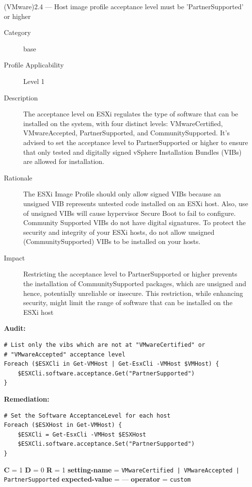 \documentclass[a4paper,11pt]{report}
\begin{document}
\begin{datasetrow}{(VMware)2.4 --- Host image profile acceptance level must be 'PartnerSupported' or higher}

\begin{description}
    \item[Category] base
    \item[Profile Applicability] Level 1
    \item[Description] The acceptance level on ESXi regulates the type of software that can be installed on the system, with four distinct levels: VMwareCertified, VMwareAccepted, PartnerSupported, and CommunitySupported. It's advised to set the acceptance level to PartnerSupported or higher to ensure that only tested and digitally signed vSphere Installation Bundles (VIBs) are allowed for installation.
    \item[Rationale] The ESXi Image Profile should only allow signed VIBs because an unsigned VIB represents untested code installed on an ESXi host. Also, use of unsigned VIBs will cause hypervisor Secure Boot to fail to configure. Community Supported VIBs do not have digital signatures. To protect the security and integrity of your ESXi hosts, do not allow unsigned (CommunitySupported) VIBs to be installed on your hosts.
    \item[Impact] Restricting the acceptance level to PartnerSupported or higher prevents the installation of CommunitySupported packages, which are unsigned and hence, potentially unreliable or insecure. This restriction, while enhancing security, might limit the range of software that can be installed on the ESXi host
\end{description}

\vspace{2pt}
\noindent\textbf{Audit:}
\begin{lstlisting}[style=azcli]
# List only the vibs which are not at "VMwareCertified" or
# "VMwareAccepted" acceptance level
Foreach ($ESXCli in Get-VMHost | Get-EsxCli -VMHost $VMHost) {
    $ESXCli.software.acceptance.Get("PartnerSupported")
}
\end{lstlisting}

\noindent\textbf{Remediation:}
\begin{lstlisting}[style=azcli]
# Set the Software AcceptanceLevel for each host
Foreach ($ESXHost in Get-VMHost) {
    $ESXCli = Get-EsxCli -VMHost $ESXHost
    $ESXCli.software.acceptance.Set("PartnerSupported")
}
\end{lstlisting}

\vspace{4pt}
\noindent
\textbf{C} = 1 \quad
\textbf{D} = 0 \quad
\textbf{R} = 1 \quad
\textbf{setting-name} = \texttt{VMwareCertified | VMwareAccepted | PartnerSupported} \quad
\textbf{expected-value} = --- \quad
\textbf{operator} = \texttt{custom}

\end{datasetrow}
\end{document}

